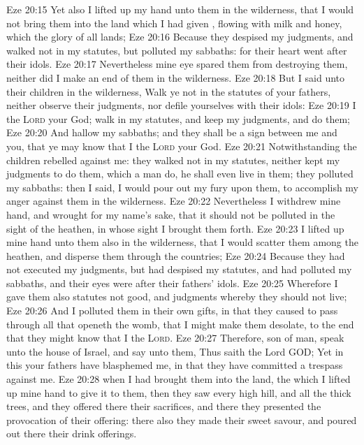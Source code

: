 \vs Eze 20:15 Yet also I lifted up my hand unto them in the wilderness, that I would not bring them into the land which I had given , flowing with milk and honey, which  the glory of all lands;
\vs Eze 20:16 Because they despised my judgments, and walked not in my statutes, but polluted my sabbaths: for their heart went after their idols.
\vs Eze 20:17 Nevertheless mine eye spared them from destroying them, neither did I make an end of them in the wilderness.
\vs Eze 20:18 But I said unto their children in the wilderness, Walk ye not in the statutes of your fathers, neither observe their judgments, nor defile yourselves with their idols:
\vs Eze 20:19 I  the \textsc{Lord} your God; walk in my statutes, and keep my judgments, and do them;
\vs Eze 20:20 And hallow my sabbaths; and they shall be a sign between me and you, that ye may know that I  the \textsc{Lord} your God.
\vs Eze 20:21 Notwithstanding the children rebelled against me: they walked not in my statutes, neither kept my judgments to do them, which  a man do, he shall even live in them; they polluted my sabbaths: then I said, I would pour out my fury upon them, to accomplish my anger against them in the wilderness.
\vs Eze 20:22 Nevertheless I withdrew mine hand, and wrought for my name's sake, that it should not be polluted in the sight of the heathen, in whose sight I brought them forth.
\vs Eze 20:23 I lifted up mine hand unto them also in the wilderness, that I would scatter them among the heathen, and disperse them through the countries;
\vs Eze 20:24 Because they had not executed my judgments, but had despised my statutes, and had polluted my sabbaths, and their eyes were after their fathers' idols.
\vs Eze 20:25 Wherefore I gave them also statutes  not good, and judgments whereby they should not live;
\vs Eze 20:26 And I polluted them in their own gifts, in that they caused to pass through  all that openeth the womb, that I might make them desolate, to the end that they might know that I  the \textsc{Lord}.
\vs Eze 20:27 Therefore, son of man, speak unto the house of Israel, and say unto them, Thus saith the Lord GOD; Yet in this your fathers have blasphemed me, in that they have committed a trespass against me.
\vs Eze 20:28  when I had brought them into the land,  the which I lifted up mine hand to give it to them, then they saw every high hill, and all the thick trees, and they offered there their sacrifices, and there they presented the provocation of their offering: there also they made their sweet savour, and poured out there their drink offerings.
